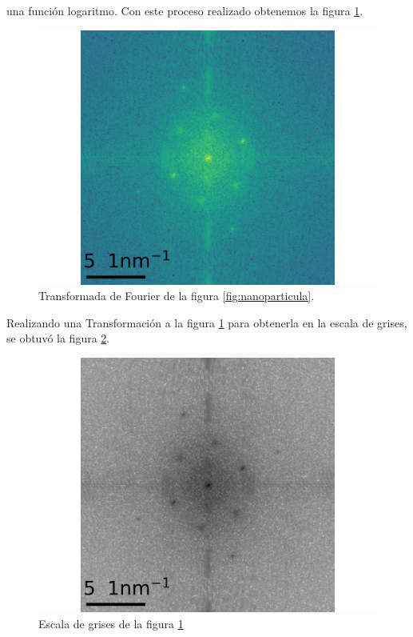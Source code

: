 \documentclass[reprint,amsmath,amssymb,aps,]{revtex4-2}
\begin{document}
una función logaritmo. Con este proceso realizado obtenemos la figura \ref{fig:fft}.
\begin{figure}[H]
    \centering
    \includegraphics[scale=0.4]{../Graphics/FFT.png}
    \caption{Transformada de Fourier de la figura \ref{fig:nanoparticula}.}
    \label{fig:fft}
\end{figure}
Realizando una Transformación a la figura \ref{fig:fft} para obtenerla en la escala de grises, se obtuvó la figura \ref{fig:fftbn}.
\begin{figure}[H]
    \centering
    \includegraphics[scale=0.4]{../Graphics/FFTBN.png}
    \caption{Escala de grises de la figura \ref{fig:fft}}
    \label{fig:fftbn}
\end{figure}
\end{document}
